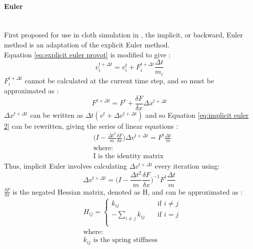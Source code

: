 \paragraph{Euler}\leavevmode\\
First proposed for use in cloth simulation in \textcite{Baraff1998}, the implicit, or backward, Euler method is an adaptation of the explicit Euler method.
\\Equation \ref{eq:explicit euler provot} is modified to give \parencite[3]{Kang2000}:
\begin{equation}
\label{eq:implicit euler 1}
  v^{t + \Delta t}_{i} = v^{t}_{i} + F^{t + \Delta t}_{i}\frac{\Delta t}{m_{i}}
\end{equation}
$F^{t + \Delta t}_{i}$ cannot be calculated at the current time step, and so must be approximated as \parencite[3]{Kang2000}:
\begin{equation}
\label{eq:implicit euler 2}
  F^{t + \Delta t} = F^{t} + \frac{\delta F}{\delta x}\Delta x^{t + \Delta t}
\end{equation}
$\Delta x^{t + \Delta t}$ can be written as $\Delta t(v^{t} + \Delta v^{t + \Delta t})$ and so Equation \ref{eq:implicit euler 2} can be rewritten, giving the series of linear equations \parencite[3]{Kang2000}:
\begin{equation}
\begin{split}
\label{eq:implicit euler 3}
  &\bigg(I - \frac{\Delta t^{2}}{m}\frac{\delta F}{\delta x}\bigg)\Delta v^{t + \Delta t} = F^{t}\frac{\Delta t}{m}
  \\&\text{where:}
  \\&\text{I is the identity matrix}
\end{split}
\end{equation}
Thus, implicit Euler involves calculating $\Delta v^{t + \Delta t}$ every iteration using:
\begin{equation}
\label{eq:implicit euler 4}
  \Delta v^{t + \Delta t} = \bigg(I - \frac{\Delta t^{2}}{m}\frac{\delta F}{\delta x}\bigg)^{-1}F^{t}\frac{\Delta t}{m}
\end{equation}
$\frac{\delta F}{\delta x}$ is the negated Hessian matrix, denoted as H, and can be approximated as \parencite[3]{Kang2000}:
\begin{equation}
\begin{split}
\label{eq:implicit euler 5}
&H_{ij} =
  \begin{cases}
    k_{ij}       & \quad \text{if } i \neq j\\
    -\sum_{i \neq j}{k_{ij}}  & \quad \text{if } i = j\\
  \end{cases}
\\&\text{where:}
\\&\text{$k_{ij}$ is the spring stiffness}
\end{split}
\end{equation}
